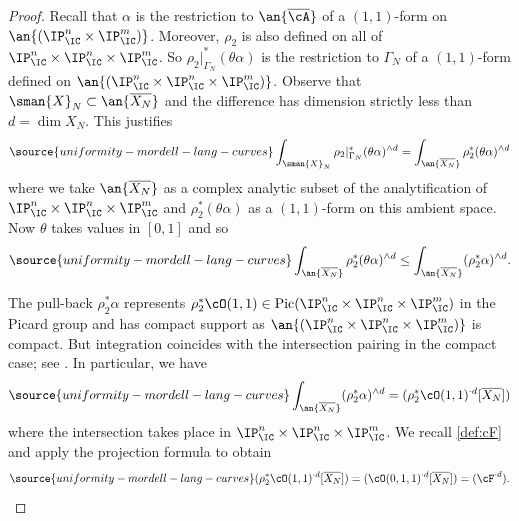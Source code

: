 \begin{proof}
Recall that $\alpha$ is the restriction to $\an{\overline{\cA}}$
of a  $(1,1)$-form on
$\an{(\IP^n_{\IC}\times\IP^m_{\IC})}$.
Moreover,
$\rho_2$ is also defined on all of $\IP^n_{\IC} \times\IP^n_{\IC}\times \IP^m_{\IC}$. So ${\rho_2}|_{\Gamma_N}^*(\theta\alpha)$ is the restriction to
$\Gamma_N$ of a $(1,1)$-form defined on $\an{(\IP^n_{\IC} \times\IP^n_{\IC}\times \IP^m_{\IC})}$.
Observe that $\sman{X}_N\subset \an{\overline{X_N}}$ and the difference has
dimension strictly less than $d=\dim X_N$.
This justifies%
\begin{equation}
\label{eq:chain3}
\source{uniformity-mordell-lang-curves}
  \int_{\sman{X}_N} \rho_2|_{\Gamma_N}^*(\theta\alpha)^{\wedge d}
  =\int_{\an{\overline{X_N}}} \rho_2^*(\theta\alpha)^{\wedge d}
\end{equation}
where we take $\an{\overline{X_N}}$ as a complex analytic subset of
the analytification of $\IP_{\IC}^n\times\IP_{\IC}^n\times \IP_{\IC}^m$ and $\rho_2^*(\theta\alpha)$ as a
$(1,1)$-form on this ambient space.
Now $\theta$ takes values in $[0,1]$ and so
\begin{equation}
\label{eq:chain4}
\source{uniformity-mordell-lang-curves}
\int_{\an{\overline{X_N}}} \rho_2^*(\theta\alpha)^{\wedge d}\le
  \int_{\an{\overline{X_N}}} (\rho_2^*\alpha)^{\wedge d}.
\end{equation}


The pull-back $\rho_2^*\alpha$ represents
$\rho_2^* \cO(1,1) \in
\mathrm{Pic}(\IP_{\IC}^n\times\IP_{\IC}^n\times\IP_{\IC}^m)$ in the
Picard group and
has compact support as $\an{(\IP_{\IC}^n\times\IP_{\IC}^n\times \IP_{\IC}^m)}$ is
compact.
But integration coincides with the intersection pairing in the compact
case; see \cite[Theorem~11.21]{voisin:hodge1}. In particular, we have
\begin{equation}
\label{eq:chain5}
\source{uniformity-mordell-lang-curves}
\int_{\an{\overline{X_N}}} (\rho_2^*\alpha)^{\wedge d} = (\rho_2^*
\cO(1,1)^{\cdot d} [\overline {X_N}]) %
\end{equation}
where the intersection takes place in
$\IP_{\IC}^n\times\IP_{\IC}^n\times\IP_{\IC}^m$. We recall \eqref{def:cF}
and apply  the projection formula to obtain
\begin{equation}
\label{eq:chain6}
\source{uniformity-mordell-lang-curves}
  (\rho_2^*
\cO(1,1)^{\cdot d}  [\overline {X_N}]) = (\cO(0,1,1)^{\cdot d}  [\overline {X_N}]) =  (\cF^{\cdot d}).
\end{equation}


\end{proof}
